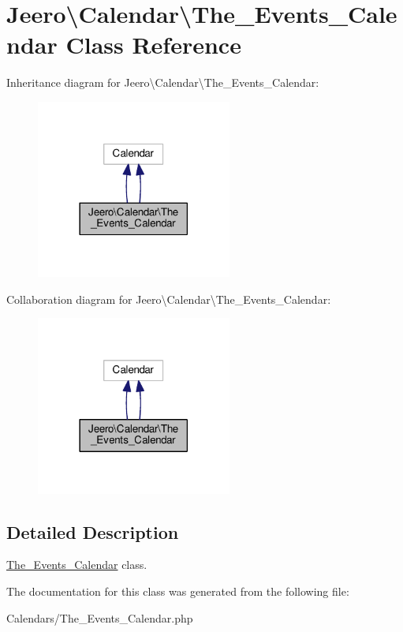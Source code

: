 \hypertarget{classJeero_1_1Calendar_1_1The__Events__Calendar}{}\section{Jeero\textbackslash{}Calendar\textbackslash{}The\+\_\+\+Events\+\_\+\+Calendar Class Reference}
\label{classJeero_1_1Calendar_1_1The__Events__Calendar}


Inheritance diagram for Jeero\textbackslash{}Calendar\textbackslash{}The\+\_\+\+Events\+\_\+\+Calendar\+:\nopagebreak
\begin{figure}[H]
\begin{center}
\leavevmode
\includegraphics[width=182pt]{classJeero_1_1Calendar_1_1The__Events__Calendar__inherit__graph}
\end{center}
\end{figure}


Collaboration diagram for Jeero\textbackslash{}Calendar\textbackslash{}The\+\_\+\+Events\+\_\+\+Calendar\+:\nopagebreak
\begin{figure}[H]
\begin{center}
\leavevmode
\includegraphics[width=182pt]{classJeero_1_1Calendar_1_1The__Events__Calendar__coll__graph}
\end{center}
\end{figure}


\subsection{Detailed Description}
\hyperlink{classJeero_1_1Calendar_1_1The__Events__Calendar}{The\+\_\+\+Events\+\_\+\+Calendar} class. 

The documentation for this class was generated from the following file\+:\begin{DoxyCompactItemize}
\item 
Calendars/The\+\_\+\+Events\+\_\+\+Calendar.\+php\end{DoxyCompactItemize}
